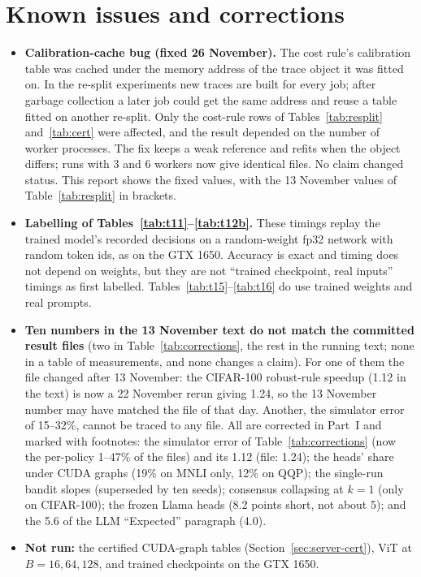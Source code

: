 \section{Known issues and corrections}\label{app:issues}
\begin{itemize}
  \item \textbf{Calibration-cache bug (fixed 26 November).} The cost rule's calibration table was cached under the
  memory address of the trace object it was fitted on. In the re-split experiments new traces are built for every
  job; after garbage collection a later job could get the same address and reuse a table fitted on another re-split.
  Only the cost-rule rows of Tables~\ref{tab:resplit} and~\ref{tab:cert} were affected, and the result depended on
  the number of worker processes. The fix keeps a weak reference and refits when the object differs; runs with 3 and
  6 workers now give identical files. No claim changed status. This report shows the fixed values, with the 13
  November values of Table~\ref{tab:resplit} in brackets.
  \item \textbf{Labelling of Tables~\ref{tab:t11}--\ref{tab:t12b}.} These timings replay the trained model's recorded
  decisions on a random-weight fp32 network with random token ids, as on the GTX 1650. Accuracy is exact and timing
  does not depend on weights, but they are not ``trained checkpoint, real inputs'' timings as first labelled.
  Tables~\ref{tab:t15}--\ref{tab:t16} do use trained weights and real prompts.
  \item \textbf{Ten numbers in the 13 November text do not match the committed result files} (two in
  Table~\ref{tab:corrections}, the rest in the running text; none in a table of measurements, and none changes a
  claim). For one of them the file changed after 13 November: the CIFAR-100 robust-rule speedup (1.12\x{} in the
  text) is now a 22 November rerun giving 1.24\x, so the 13 November number may have matched the file of that day.
  Another, the simulator error of 15--32\%, cannot be traced to any file. All are corrected in Part~I and marked with
  footnotes: the simulator error of Table~\ref{tab:corrections} (now the per-policy 1--47\% of the files) and its
  1.12\x{} (file: 1.24\x); the heads' share under CUDA graphs (19\% on MNLI only, 12\%
  on QQP); the single-run bandit slopes (superseded by ten seeds); consensus collapsing at $k=1$ (only on CIFAR-100);
  the frozen Llama heads (8.2 points short, not about 5); and the 5.6 of the LLM ``Expected'' paragraph (4.0).
  \item \textbf{Not run:} the certified CUDA-graph tables (Section~\ref{sec:server-cert}), ViT at $B=16,64,128$, and
  trained checkpoints on the GTX 1650.
\end{itemize}

